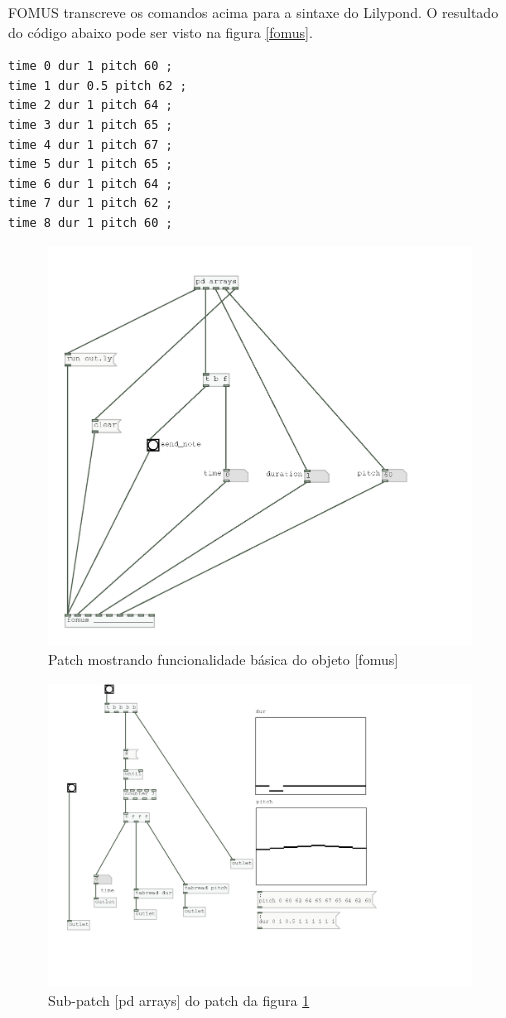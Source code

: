 \documentclass[draft]{ppgmus}
\begin{document}
FOMUS transcreve os comandos acima para a sintaxe do Lilypond.
O resultado do código abaixo pode ser visto na figura \ref{fomus}.


\begin{verbatim}
time 0 dur 1 pitch 60 ;
time 1 dur 0.5 pitch 62 ;
time 2 dur 1 pitch 64 ;
time 3 dur 1 pitch 65 ;
time 4 dur 1 pitch 67 ;
time 5 dur 1 pitch 65 ;
time 6 dur 1 pitch 64 ;
time 7 dur 1 pitch 62 ;
time 8 dur 1 pitch 60 ;
\end{verbatim}


\begin{figure}
\includegraphics[scale=.6]{sinc-fomus}
\caption{Patch mostrando funcionalidade básica do objeto [fomus]}
\label{sinc-fomus}
\end{figure}


\begin{figure}
\includegraphics[scale=.6]{sinc-fomus-array}
\caption{Sub-patch [pd arrays] do patch da figura \ref{sinc-fomus}}
\label{sinc-fomus-array}
\end{figure}
\end{document}

